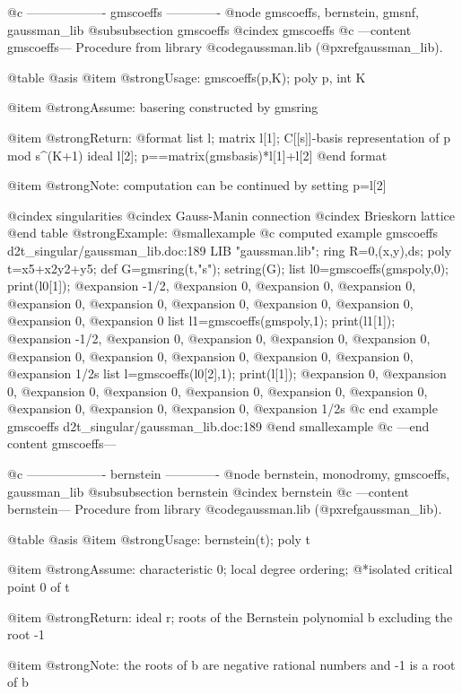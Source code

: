 @c ------------------- gmscoeffs -------------
@node gmscoeffs, bernstein, gmsnf, gaussman_lib
@subsubsection gmscoeffs
@cindex gmscoeffs
@c ---content gmscoeffs---
Procedure from library @code{gaussman.lib} (@pxref{gaussman_lib}).

@table @asis
@item @strong{Usage:}
gmscoeffs(p,K); poly p, int K

@item @strong{Assume:}
basering constructed by gmsring

@item @strong{Return:}
@format
list l;
  matrix l[1];  C[[s]]-basis representation of p mod s^(K+1)
  ideal l[2];  p==matrix(gmsbasis)*l[1]+l[2]
@end format

@item @strong{Note:}
computation can be continued by setting p=l[2]

@cindex singularities
@cindex Gauss-Manin connection
@cindex Brieskorn lattice
@end table
@strong{Example:}
@smallexample
@c computed example gmscoeffs d2t_singular/gaussman_lib.doc:189 
LIB "gaussman.lib";
ring R=0,(x,y),ds;
poly t=x5+x2y2+y5;
def G=gmsring(t,"s");
setring(G);
list l0=gmscoeffs(gmspoly,0);
print(l0[1]);
@expansion{} -1/2,
@expansion{} 0,   
@expansion{} 0,   
@expansion{} 0,   
@expansion{} 0,   
@expansion{} 0,   
@expansion{} 0,   
@expansion{} 0,   
@expansion{} 0,   
@expansion{} 0,   
@expansion{} 0    
list l1=gmscoeffs(gmspoly,1);
print(l1[1]);
@expansion{} -1/2,
@expansion{} 0,   
@expansion{} 0,   
@expansion{} 0,   
@expansion{} 0,   
@expansion{} 0,   
@expansion{} 0,   
@expansion{} 0,   
@expansion{} 0,   
@expansion{} 0,   
@expansion{} 1/2s 
list l=gmscoeffs(l0[2],1);
print(l[1]);
@expansion{} 0,  
@expansion{} 0,  
@expansion{} 0,  
@expansion{} 0,  
@expansion{} 0,  
@expansion{} 0,  
@expansion{} 0,  
@expansion{} 0,  
@expansion{} 0,  
@expansion{} 0,  
@expansion{} 1/2s
@c end example gmscoeffs d2t_singular/gaussman_lib.doc:189
@end smallexample
@c ---end content gmscoeffs---

@c ------------------- bernstein -------------
@node bernstein, monodromy, gmscoeffs, gaussman_lib
@subsubsection bernstein
@cindex bernstein
@c ---content bernstein---
Procedure from library @code{gaussman.lib} (@pxref{gaussman_lib}).

@table @asis
@item @strong{Usage:}
bernstein(t); poly t

@item @strong{Assume:}
characteristic 0; local degree ordering;
@*isolated critical point 0 of t

@item @strong{Return:}
ideal r; roots of the Bernstein polynomial b excluding the root -1

@item @strong{Note:}
the roots of b are negative rational numbers and -1 is a root of b

